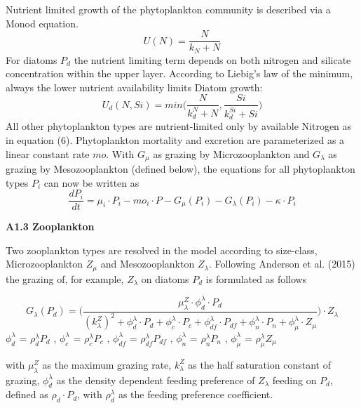 Nutrient limited growth of the phytoplankton community is described via a Monod equation. 
\begin{equation}
U(N) = \frac{N} {k_N + N}
\end{equation}
For diatoms $P_d$ the nutrient limiting term depends on both nitrogen and silicate concentration within the upper layer. According to Liebig's law of the minimum, always the lower nutrient availability limits Diatom growth:
\begin{equation}
U_{d}(N,Si) = min \Big( \frac{N} {k_{d}^N + N}, \frac{Si} {k_{d}^{Si} + Si} \Big)
\end{equation}
All other phytoplankton types are nutrient-limited only by available Nitrogen as in equation (6). Phytoplankton mortality and excretion are parameterized as a linear constant rate $mo$. With $G_{\mu}$ as grazing by Microzooplankton and $G_{\lambda}$ as grazing by Mesozooplankton (defined below), the equations for all phytoplankton types $P_i$ can now be written as
\begin{equation}
\frac{dP_{i}}{dt} = \mu_{i} \cdot P_{i} - mo_{i} \cdot P - G_{\mu}(P_{i}) - G_{\lambda}(P_{i}) - \kappa \cdot P_{i}
\end{equation}

{\bf {\large A1.3 Zooplankton}}

Two zooplankton types are resolved in the model according to size-class, Microzooplankton $Z_{\mu}$ and Mesozooplankton $Z_{\lambda}$. Following Anderson et al. (2015) the grazing of, for example, $Z_{\lambda}$ on diatoms $P_d$ is formulated as follows

\begin{equation}
G_{\lambda}(P_{d}) = \Bigg( \frac{\mu^Z_{\lambda} \cdot \phi^{\lambda}_d \cdot P_d} 
							{(k^Z_{\lambda})^2 + \phi^{\lambda}_d \cdot P_d + \phi^{\lambda}_c \cdot P_c + \phi^{\lambda}_{df} \cdot P_{df} + \phi^{\lambda}_{n} \cdot P_{n} + \phi^{\lambda}_{\mu} \cdot Z_{\mu}} \Bigg) \cdot Z_{\lambda}
\end{equation}
$\phi^{\lambda}_{d}$ = $\rho^{\lambda}_{d} P_{d}$ , $\phi^{\lambda}_{c}$ = $\rho^{\lambda}_{c} P_{c}$ , $\phi^{\lambda}_{df}$ = $\rho^{\lambda}_{df} P_{df}$ , $\phi^{\lambda}_{n}$ = $\rho^{\lambda}_{n} P_{n}$ , $\phi^{\lambda}_{\mu}$ = $\rho^{\lambda}_{\mu} Z_{\mu}$

with $\mu^Z_{\lambda}$ as the maximum grazing rate, $k^Z_{\lambda}$ as the half saturation constant of grazing, $\phi^{\lambda}_{d}$ as the density dependent feeding preference of $Z_{\lambda}$ feeding on $P_d$, defined as $\rho_{d} \cdot P_{d}$, with $\rho^{\lambda}_{d}$ as the feeding preference coefficient.



